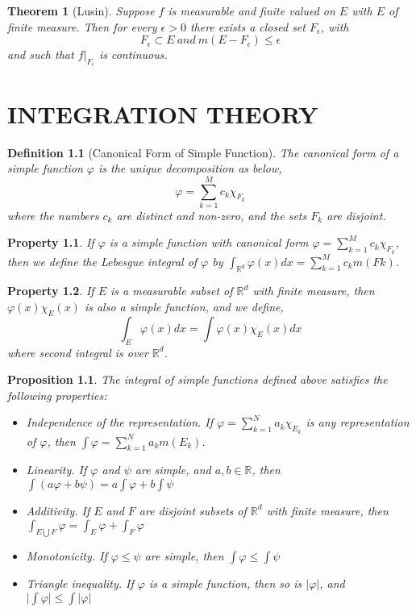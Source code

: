 \documentclass{report}
\theoremstyle{upthm}
\newtheorem{thm}{Theorem}
\newtheorem{defn}{Definition}
\newtheorem{prop}{Proposition}
\newtheorem{property}{Property}
\newcommand{\reals}{\mathbb{R}}
\newcommand{\union}{\bigcup}
\newcommand{\vl}{\Big|}
\begin{document}
\begin{thm}[Lusin]
	Suppose $f$ is measurable and finite valued on $E$ with $E$ of finite measure. Then for every $\epsilon > 0$ there exists a closed set $F_\epsilon$, with
	$$F_\epsilon \subset E\ and\ m(E - F_\epsilon) \leq \epsilon$$
	and such that $f|_{F_\epsilon}$ is continuous.
\end{thm}

\chapter{INTEGRATION THEORY}
\begin{defn}[Canonical Form of Simple Function]
	The canonical form of a simple function $\varphi$ is the unique decomposition as below,
	$$  \varphi = \sum_{k=1}^{M} c_k \chi_{F_k}  $$
	 where the numbers $c_k$ are distinct and non-zero, and the sets $F_k$ are disjoint.
\end{defn}
\begin{property}
	If $\varphi$ is a simple function with canonical form $  \varphi = \sum_{k=1}^{M} c_k \chi_{F_k}  $, then we define the Lebesgue integral of $\varphi$ by $\int_{\reals^d}^{} \varphi(x) dx = \sum_{k=1}^{M} c_k m(Fk)$.
\end{property}
\begin{property}
	If $E$ is a measurable subset of $\reals^d$ with finite measure, then $ \varphi(x) \chi_E(x)$
	is also a simple function, and we define,
	$$ \int_{E} \varphi(x) dx = \int \varphi(x) \chi_E(x) dx $$
	where second integral is over $\reals^d$.
\end{property}

\begin{prop}
	The integral of simple functions defined above satisfies the following properties:
	\begin{itemize}
		\item Independence of the representation. If $ \varphi = \sum_{k=1}^{N} a_k \chi_{E_k}$ is any representation of $\varphi$, then $ \int \varphi = \sum_{k=1}^{N} a_k m(E_k) $.
		\item Linearity. If $\varphi$ and $\psi$ are simple, and $a, b \in \reals$, then $\int (a \varphi + b \psi) = a \int \varphi + b \int \psi $
		\item Additivity. If $E$ and $F$ are disjoint subsets of $\reals^d$ with finite measure, then $ \int_{E \union F} \varphi = \int_{E} \varphi + \int_{F} \varphi $
		\item Monotonicity. If $\varphi  \leq \psi$ are simple, then $ \int \varphi \leq \int \psi$
		\item Triangle inequality. If $\varphi$ is a simple function, then so is $|\varphi|$, and $ \vl \int \varphi \vl \leq \int | \varphi |  $
	\end{itemize}
\end{prop}
\end{document}

